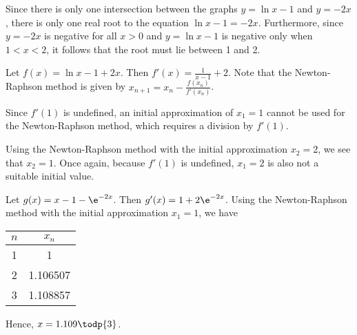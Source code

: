 \begin{solution}
\begin{ppart}
\begin{center}
        \end{center}

        Since there is only one intersection between the graphs $y = \ln{x-1}$ and $y = -2x$, there is only one real root to the equation $\ln{x-1} = -2x$. Furthermore, since $y=-2x$ is negative for all $x > 0$ and $y = \ln{x-1}$ is negative only when $1 < x < 2$, it follows that the root must lie between 1 and 2.

        Let $f(x) = \ln{x-1} + 2x$. Then $f'(x) = \frac1{x-1} + 2$. Note that the Newton-Raphson method is given by $x_{n+1} = x_n - \frac{f(x_n)}{f'(x_n)}$.

        Since $f'(1)$ is undefined, an initial approximation of $x_1 = 1$ cannot be used for the Newton-Raphson method, which requires a division by $f'(1)$.

        Using the Newton-Raphson method with the initial approximation $x_2 = 2$, we see that $x_2 = 1$. Once again, because $f'(1)$ is undefined, $x_1 = 2$ is also not a suitable initial value.

        Let $g(x) = x-1-\e^{-2x}$. Then $g'(x) = 1+2\e^{-2x}$. Using the Newton-Raphson method with the initial approximation $x_1=1$, we have
        \begin{table}[H]
            \centering
            \begin{tabular}{|c|c|}
            \hline
            $n$ & $x_n$ \\ \hline
            1 & 1 \\ \hline
            2 & 1.106507 \\ \hline
            3 & 1.108857 \\ \hline
            \end{tabular}
        \end{table}
        Hence, $x = 1.109 \todp{3}$.
    \end{ppart}
\end{solution}

